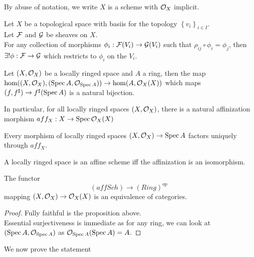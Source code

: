 \documentclass[../main.tex]{subfiles}
\begin{document}
\begin{rmq}
By abuse of notation, we write $X$ is a scheme with $\mathcal{O}_X$ implicit.
\end{rmq}
\begin{lemma}
Let $X$ be a topological space with basiis for the topology $\left\{ v_i \right\}_{i \in I} $.\\
Let $\mathcal{F}$ and $\mathcal{G}$ be sheaves on $X$.\\
For any collection of morphisms $\phi_i: \mathcal{F}( V_i) \to \mathcal{G}( V_i) $ such that $\rho_{ij} \circ\phi_i= \phi_j$, then $\exists!\phi:\mathcal{F}\to \mathcal{G}$ which restricts to $\phi_i$ on the $V_i$.
\end{lemma}
\begin{propo}
Let $( X,\mathcal{O}_X) $ be a locally ringed space and $A$ a ring, then the map $\hom( ( X,\mathcal{O}_X) , ( \operatorname{Spec} A, \mathcal{O}_{\operatorname{Spec} A} ) ) \to \hom( A,\mathcal{O}_X( X) ) $ which maps $( f,f^{\sharp}) \to f^{\sharp}( \operatorname{Spec} A) $ is a natural bijection.\\
\end{propo}
In particular, for all locally ringed spaces $( X,\mathcal{O}_X) $, there is a natural affinization morphism $aff_X: X\to \operatorname{Spec} \mathcal{O}_X ( X) $ 
\begin{crly}
Every morphism of locally ringed spaces $( X,\mathcal{O}_X) \to \operatorname{Spec} A$ factors uniquely through $aff_X$.
\end{crly}
\begin{crly}
A locally ringed space is an affine scheme iff the affinization is an isomorphism.
\end{crly}
\begin{crly}
The functor 
\[ 
	( affSch) \to ( Ring)^{op}
\]
mapping $( X,\mathcal{O}_X) \to \mathcal{O}_X( X) $ is an equivalence of categories.
\end{crly}
\begin{proof}
Fully faithful is the proposition above.\\
Essential surjectiveness is immediate as for any ring, we can look at $( \operatorname{Spec} A, \mathcal{O}_{\operatorname{Spec} A} ) $ as $\mathcal{O}_{\operatorname{Spec} A} ( \operatorname{Spec} A) = A$.
\end{proof}
We now prove the statement
\end{document}

